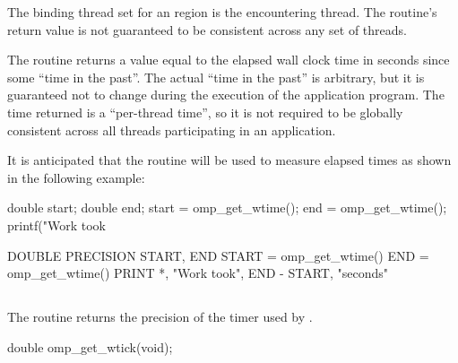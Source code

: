 \binding
The binding thread set for an  region is the encountering thread. The
routine's return value is not guaranteed to be consistent across any set of threads.

\effect
The  routine returns a value equal to the elapsed wall clock time in
seconds since some ``time in the past''. The actual ``time in the past'' is arbitrary, but it is
guaranteed not to change during the execution of the application program. The time
returned is a ``per-thread time'', so it is not required to be globally consistent across all
threads participating in an application.

\begin{note}
It is anticipated that the routine will be used to measure elapsed times as shown
in the following example:

\begin{ccppspecific}
\begin{ompcFunction}
double start;
double end;
start = omp_get_wtime();
end = omp_get_wtime();
printf("Work took %
\end{ompcFunction}
\end{ccppspecific}

\begin{fortranspecific}
\begin{ompcFunction}
DOUBLE PRECISION START, END
START = omp_get_wtime()
END = omp_get_wtime()
PRINT *, "Work took", END - START, "seconds"
\end{ompcFunction}
\end{fortranspecific}
\end{note}









\subsection{}
\label{subsec:omp_get_wtick}
\summary
The  routine returns the precision of the timer used by
.


\format
\begin{ccppspecific}
\begin{ompcFunction}
double omp_get_wtick(void);
\end{ompcFunction}
\end{ccppspecific}

